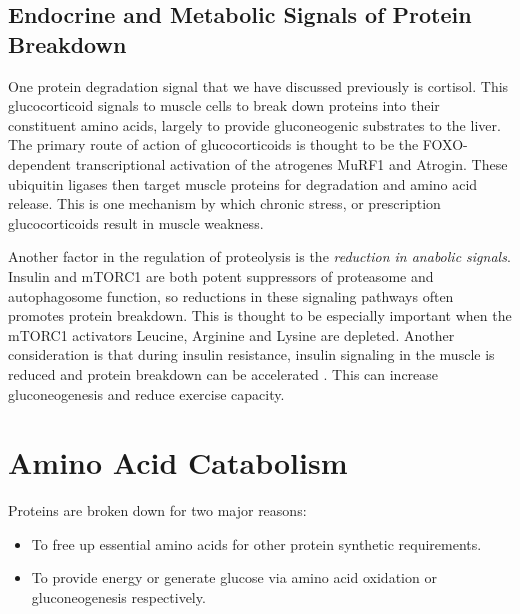 \documentclass{tufte-handout}
\begin{document}
\subsection{Endocrine and Metabolic Signals of Protein Breakdown}

One protein degradation signal that we have discussed previously is cortisol.  This glucocorticoid signals to muscle cells to break down proteins into their constituent amino acids, largely to provide gluconeogenic substrates to the liver.  The primary route of action of glucocorticoids is thought to be the FOXO-dependent transcriptional activation of the atrogenes MuRF1 and Atrogin.  These ubiquitin ligases then target muscle proteins for degradation and amino acid release.  This is one mechanism by which chronic stress, or prescription glucocorticoids result in muscle weakness.

Another factor in the regulation of proteolysis is the \emph{reduction in anabolic signals}.  Insulin and mTORC1 are both potent suppressors of proteasome and autophagosome function, so reductions in these signaling pathways often promotes protein breakdown.  This is thought to be especially important when the mTORC1 activators Leucine, Arginine and Lysine are depleted.  Another consideration is that during insulin resistance, insulin signaling in the muscle is reduced and protein breakdown can be accelerated \citep{Wang2006b}.  This can increase gluconeogenesis and reduce exercise capacity.

\section{Amino Acid Catabolism}

Proteins are broken down for two major reasons:

\begin{itemize}
\item To free up essential amino acids for other protein synthetic requirements.
\item To provide energy or generate glucose via amino acid oxidation or gluconeogenesis respectively.
\end{itemize}	
\end{document}
